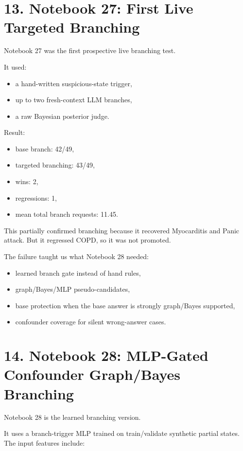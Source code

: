 \documentclass[11pt]{article}
\begin{document}
\section*{13. Notebook 27: First Live Targeted Branching}

Notebook 27 was the first prospective live branching test.

It used:

\begin{itemize}[leftmargin=*]
    \item a hand-written suspicious-state trigger,
    \item up to two fresh-context LLM branches,
    \item a raw Bayesian posterior judge.
\end{itemize}

Result:

\begin{itemize}[leftmargin=*]
    \item base branch: 42/49,
    \item targeted branching: 43/49,
    \item wins: 2,
    \item regressions: 1,
    \item mean total branch requests: 11.45.
\end{itemize}

This partially confirmed branching because it recovered Myocarditis and Panic attack. But it regressed COPD, so it was not promoted.

The failure taught us what Notebook 28 needed:

\begin{itemize}[leftmargin=*]
    \item learned branch gate instead of hand rules,
    \item graph/Bayes/MLP pseudo-candidates,
    \item base protection when the base answer is strongly graph/Bayes supported,
    \item confounder coverage for silent wrong-answer cases.
\end{itemize}

\section*{14. Notebook 28: MLP-Gated Confounder Graph/Bayes Branching}

Notebook 28 is the learned branching version.

It uses a branch-trigger MLP trained on train/validate synthetic partial states. The input features include:
\end{document}
